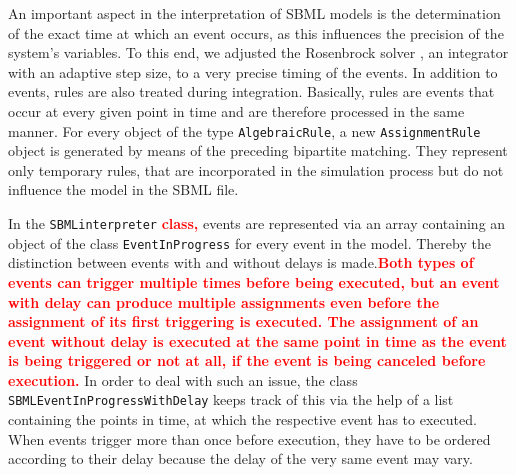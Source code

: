 \documentclass[10pt]{bmc_article}
\newenvironment{bmcformat}{\baselineskip20pt\sloppy\setboolean{publ}{false}}{\baselineskip20pt\sloppy}
\newcommand{\TODO}[1]{\textcolor{red}{\textbf{#1}}}
\newcommand{\AlgebraicRule}{\texttt{Algebraic\-Rule}}
\newcommand{\AssignmentRule}{\texttt{Assignment\-Rule}}
\newcommand{\SBMLinterpreter}{\texttt{SBML\-interpreter}}
\newcommand{\EventInProgress}{\texttt{Event\-In\-Progress}}
\newcommand{\SBMLEventInProgressWithDelay}{\texttt{SBML\-Event\-In\-Progress\-With\-Delay}}
\begin{document}
\begin{bmcformat}
%
An important aspect in the interpretation of SBML models is the determination of the exact time at which an event occurs, as this influences the precision of the system's variables. To this end, we adjusted the Rosenbrock solver \cite{Kotcon2011}, an integrator with an adaptive step size, to a very precise timing of the events. %
% 
In addition to events, rules are also treated during integration. Basically, rules are events that occur at every given point in time and are therefore processed in the same manner. For every object of the type \AlgebraicRule{}, a new \AssignmentRule{} object is generated by means of the preceding bipartite matching. They represent only temporary rules, that are incorporated in the simulation process but do not influence the model in the SBML file.
%

In the \SBMLinterpreter{} \TODO{class,} events are represented via an array containing an object of the class \EventInProgress{} for every event in the model. Thereby the distinction between events with and without delays is made.\TODO{Both types of events can trigger multiple times before being executed, but an event with delay can produce multiple assignments even before the assignment of its first triggering is executed. The assignment of an event without delay is executed at the same point in time as the event is being triggered or not at all, if the event is being canceled before execution.} In order to deal with such an issue, the class \SBMLEventInProgressWithDelay{} keeps track of this via the help of a list containing the points in time, at which the respective event has to executed. When events trigger more than once before execution, they have to be ordered according to their delay because the delay of the very same event may vary.


\end{bmcformat}
\end{document}
